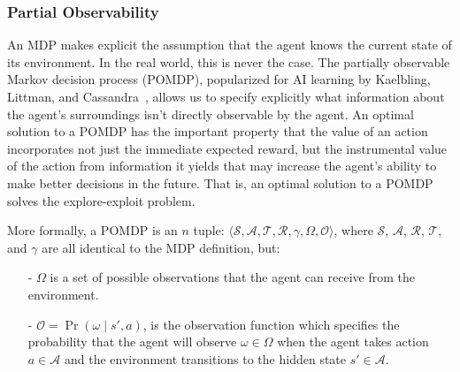 \documentclass[11pt]{article}
\newcommand\jmnote[1]{\textcolor{red}{James: #1}}
\begin{document}
\subsubsection{Partial Observability}
An MDP makes explicit the assumption that the agent knows the current state of its environment. In the real world, this is never the case.
The partially observable Markov decision process (POMDP), popularized for AI learning by Kaelbling, Littman, and Cassandra~, allows us to specify explicitly what information about the agent's surroundings 
isn't directly observable by the agent. An optimal solution to a POMDP has the important property that the value of an action incorporates not just the immediate expected reward, but the instrumental value of the action from information it yields that may increase the agent's ability to make better decisions in the future. That is, an optimal solution to a POMDP solves the explore-exploit problem.  

More formally, a POMDP is an $n$ tuple: $\langle \mathcal{S},\mathcal{A},\mathcal{T},\mathcal{R}, \gamma, \Omega,\mathcal{O} \rangle$, where $\mathcal{S}$, $\mathcal{A}$, $\mathcal{R}$, $\mathcal{T}$, and $\gamma$ are all identical to the MDP definition, but:
\begin{itemize}
\item[-] $\Omega$ is a set of possible observations that the agent can receive from the environment.
\item[-] $\mathcal{O} = \Pr(\omega \mid s', a)$, is the observation function which specifies the probability that the agent will observe $\omega \in \Omega$ when the agent takes action $a \in \mathcal{A}$ and the environment transitions to the hidden state $s' \in \mathcal{A}$.
\end{itemize}
\end{document}

